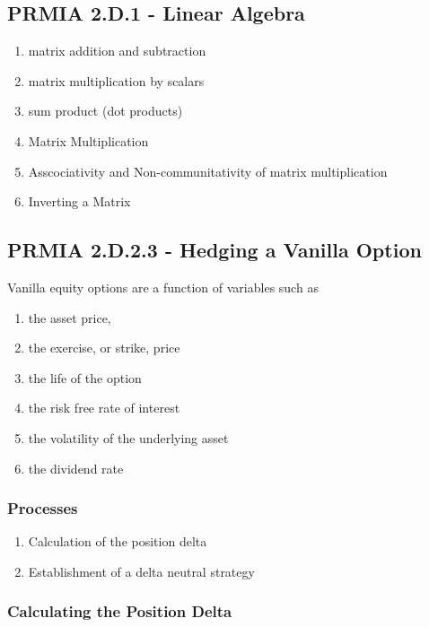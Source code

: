 
\subsection{PRMIA 2.D.1 - Linear Algebra}

\begin{enumerate}
\item matrix addition and subtraction
\item matrix multiplication by scalars
\item sum product (dot products)
\item Matrix Multiplication
\item Asscociativity and Non-communitativity of matrix multiplication
\item Inverting a Matrix
\end{enumerate}

\subsection{PRMIA 2.D.2.3  - Hedging a Vanilla Option}

Vanilla equity options are a function of variables such as

\begin{enumerate}
\item the asset price,
\item the exercise, or strike, price
\item the life of the option
\item the risk free rate of interest
\item the volatility of the underlying asset
\item the dividend rate
\end{enumerate}

\subsubsection*{Processes}

\begin{enumerate}
\item Calculation of the position delta
\item Establishment of a delta neutral strategy
\end{enumerate}

\subsubsection*{Calculating the Position Delta}

